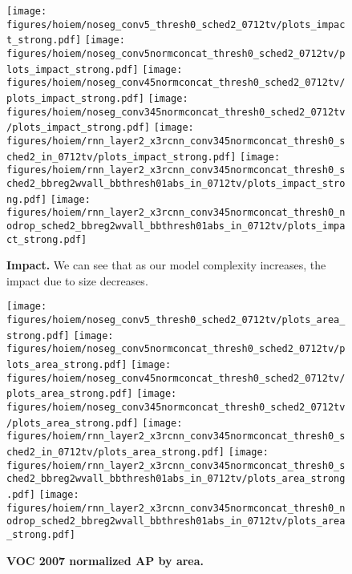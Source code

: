 \begin{figure}[t]
  \begin{center}
   \texttt{[image: figures/hoiem/noseg\_conv5\_thresh0\_sched2\_0712tv/plots\_impact\_strong.pdf]}
   \texttt{[image: figures/hoiem/noseg\_conv5normconcat\_thresh0\_sched2\_0712tv/plots\_impact\_strong.pdf]}
   \texttt{[image: figures/hoiem/noseg\_conv45normconcat\_thresh0\_sched2\_0712tv/plots\_impact\_strong.pdf]}
   \texttt{[image: figures/hoiem/noseg\_conv345normconcat\_thresh0\_sched2\_0712tv/plots\_impact\_strong.pdf]}
   \texttt{[image: figures/hoiem/rnn\_layer2\_x3rcnn\_conv345normconcat\_thresh0\_sched2\_in\_0712tv/plots\_impact\_strong.pdf]}
   \texttt{[image: figures/hoiem/rnn\_layer2\_x3rcnn\_conv345normconcat\_thresh0\_sched2\_bbreg2wvall\_bbthresh01abs\_in\_0712tv/plots\_impact\_strong.pdf]}
   \texttt{[image: figures/hoiem/rnn\_layer2\_x3rcnn\_conv345normconcat\_thresh0\_nodrop\_sched2\_bbreg2wvall\_bbthresh01abs\_in\_0712tv/plots\_impact\_strong.pdf]}
  \end{center}
  \vspace{-12pt}
  \caption{\textbf{Impact.}  We can see that as our model complexity increases, the impact due
    to size decreases.
  }
  \label{fig:hoiem}
\end{figure}

\begin{figure}[t]
  \begin{center}
   \texttt{[image: figures/hoiem/noseg\_conv5\_thresh0\_sched2\_0712tv/plots\_area\_strong.pdf]}
   \texttt{[image: figures/hoiem/noseg\_conv5normconcat\_thresh0\_sched2\_0712tv/plots\_area\_strong.pdf]}
   \texttt{[image: figures/hoiem/noseg\_conv45normconcat\_thresh0\_sched2\_0712tv/plots\_area\_strong.pdf]}
   \texttt{[image: figures/hoiem/noseg\_conv345normconcat\_thresh0\_sched2\_0712tv/plots\_area\_strong.pdf]}
   \texttt{[image: figures/hoiem/rnn\_layer2\_x3rcnn\_conv345normconcat\_thresh0\_sched2\_in\_0712tv/plots\_area\_strong.pdf]}
   \texttt{[image: figures/hoiem/rnn\_layer2\_x3rcnn\_conv345normconcat\_thresh0\_sched2\_bbreg2wvall\_bbthresh01abs\_in\_0712tv/plots\_area\_strong.pdf]}
   \texttt{[image: figures/hoiem/rnn\_layer2\_x3rcnn\_conv345normconcat\_thresh0\_nodrop\_sched2\_bbreg2wvall\_bbthresh01abs\_in\_0712tv/plots\_area\_strong.pdf]}
  \end{center}
  \vspace{-12pt}
  \caption{\textbf{VOC 2007 normalized AP by area.}
  }
  \label{fig:hoiem}
\end{figure}

